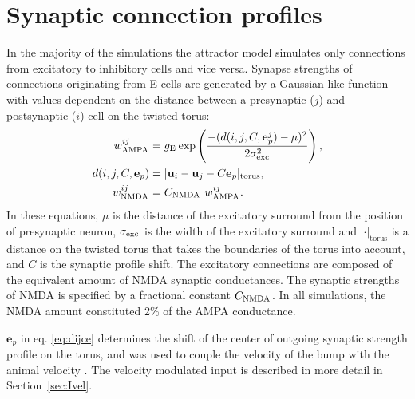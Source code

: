 \documentclass[a4paper,12pt]{article}
\newcommand{\ssc}[3]{\ensuremath{#1_{\text{#2}_{\text{#3}}}}}
\newcommand{\wAMPA   }{\ssc{w}      {\scriptsize{AMPA}}{}}
\newcommand{\wNMDA   }{\ssc{w}      {\scriptsize{NMDA}}{}}
\newcommand{\cNMDA   }{\ssc{C}      {\scriptsize{NMDA}}{}}
\newcommand{\sigmasub}[1]{\ssc{\sigma}{\scriptsize{#1}}{}}
\newcommand{\gE      }{\ssc{g}      {\scriptsize{E}}{}}
\newcommand{\dijce}{\ensuremath{d(i, j, C, \mathbf{e}_p^j)}}
\begin{document}


\section{Synaptic connection profiles} \label{conn_profiles}

In the majority of the simulations the attractor model 
simulates only connections from excitatory to inhibitory cells and vice versa.
Synapse strengths of connections originating from E cells are generated by
a Gaussian-like function with values dependent on the distance between a
presynaptic ($j$) and postsynaptic ($i$) cell on the twisted torus:
\begin{align}
    \wAMPA^{ij} &= \gE \exp\left(
                   \frac{-(\dijce - \mu)^2}{2 \sigmasub{exc}^2}
                   \right), \label{eq:wAMPA} \\
    d(i, j, C, \mathbf{e}_p)  &= | \mathbf{u}_i - \mathbf{u}_j -
            C  \mathbf{e}_p |_{\mathrm{torus}}, \label{eq:dijce} \\
    \wNMDA^{ij} &= \cNMDA\ \wAMPA^{ij}. \label{eq:wNMDA}
\end{align}
In these equations, $\mu$ is the distance of the excitatory surround from the
position of presynaptic neuron, $\sigmasub{exc}$ is the width of the excitatory
surround and $|\cdot|_{\mathrm{torus}}$ is a distance on the twisted torus that
takes the boundaries of the torus into account, and $C$ is the
synaptic profile shift. The excitatory connections are
composed of the equivalent amount of NMDA synaptic conductances. The synaptic
strengths of NMDA is specified by a fractional constant \cNMDA. In all
simulations, the NMDA amount constituted 2\% of the AMPA conductance.

$\mathbf{e}_p$ in eq. \eqref{eq:dijce} determines the shift of the center of
outgoing synaptic strength profile on the torus, and was used to couple the
velocity of the bump with the animal velocity
\citep{Burak:2009fx,Pastoll:2013ff}. The velocity modulated input is described
in more detail in Section~\ref{sec:Ivel}.
\end{document}
